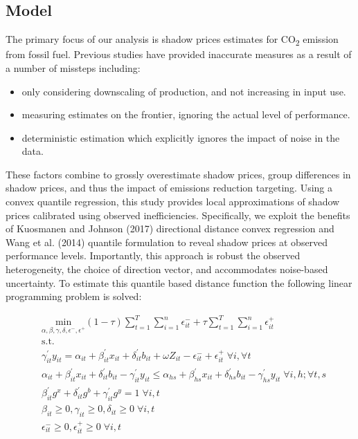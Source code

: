 \documentclass[
  10pt,
]{article}
\providecommand{\tightlist}{%
  \setlength{\itemsep}{0pt}\setlength{\parskip}{0pt}}
\begin{document}
\hypertarget{model}{%
\subsection{Model}\label{model}}

The primary focus of our analysis is shadow prices estimates for
CO\textsubscript{2} emission from fossil fuel. Previous studies have
provided inaccurate measures as a result of a number of missteps
including:

\begin{itemize}
\tightlist
\item
  only considering downscaling of production, and not increasing in
  input use.
\item
  measuring estimates on the frontier, ignoring the actual level of
  performance.
\item
  deterministic estimation which explicitly ignores the impact of noise
  in the data.
\end{itemize}

These factors combine to grossly overestimate shadow prices, group
differences in shadow prices, and thus the impact of emissions reduction
targeting. Using a convex quantile regression, this study provides local
approximations of shadow prices calibrated using observed
inefficiencies. Specifically, we exploit the benefits of Kuosmanen and
Johnson (2017) directional distance convex regression and Wang et al.
(2014) quantile formulation to reveal shadow prices at observed
performance levels. Importantly, this approach is robust the observed
heterogeneity, the choice of direction vector, and accommodates
noise-based uncertainty. To estimate this quantile based distance
function the following linear programming problem is solved:

\begin{equation}
\begin{split}
& \underset{\alpha,\beta,\gamma,\delta,\epsilon^-,\epsilon^+}{\text{min}}
 (1-\tau) \sum^{T}_{t=1} \sum^{n}_{i=1}\epsilon^-_{it} + \tau \sum^{T}_{t=1}  \sum^{n}_{i=1}\epsilon^+_{it}  \\
&\text{s.t.} \\
&\gamma^{'}_{it}y_{it}=\alpha_{it}+\beta^{'}_{it}x_{it}+\delta^{'}_{it}b_{it} + \omega Z_{it} -\epsilon^-_{it}+\epsilon^+_{it} \; \forall i ,\forall t \\
&\alpha_{it}+\beta^{'}_{it}x_{it}+\delta^{'}_{it}b_{it}-\gamma^{'}_{it}y_{it} \leq \alpha_{hs}+\beta^{'}_{hs}x_{it}+\delta^{'}_{hs}b_{it}-\gamma^{'}_{hs}y_{it} \; \forall i,h ; \forall t,s \\
& \beta^{'}_{it}g^x+\delta^{'}_{it}g^b+\gamma^{'}_{it}g^y=1 \; \forall i,t\\
& \beta_{it} \geq0,\gamma_{it} \geq0,\delta_{it} \geq0 \; \forall i,t \\
& \epsilon^-_{it} \geq0, \epsilon^+_{it} \geq 0 \; \forall i,t
\end{split}
\end{equation}
\end{document}
